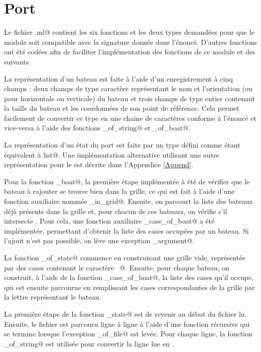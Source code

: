 \documentclass[a4paper,12pt]{article}
\begin{document}
\section{Port}

Le fichier \verb@port.ml@ contient les six fonctions et les deux types demandées pour que le module \verb@Port@ soit compatible avec la signature donnée dans l'énoncé. D'autres fonctions ont été codées afin de faciliter l'implémentation des fonctions de ce module et des suivants.

La représentation d'un bateau est faite à l'aide d'un enregistrement à cinq champs : deux champs de type caractère représentant le nom et l'orientation (\verb@H@ ou \verb@V@ pour horizontale ou verticale) du bateau et trois champs de type entier contenant la taille du bateau et les coordonnées de son point de référence. Cela permet facilement de convertir ce type en une chaine de caractères conforme à l'énoncé et vice-versa à l'aide des fonctions \verb@boat_of_string@ et \verb@string_of_boat@.

La représentation d'un état du port est faite par un type \verb@state@ défini comme étant équivalent à \verb@boat list@. Une implémentation alternative utilisant une autre représentation pour le \verb@state@ est décrite dans l'Appendice \ref{Append}.

Pour la fonction \verb@add_boat@, la première étape implémentée à été de vérifier que le bateau \verb@b@ à rajouter se trouve bien dans la grille, ce qui est fait à l'aide d'une fonction auxiliaire nommée \verb@boat_in_grid@. Ensuite, on parcourt la liste des bateaux déjà présents dans la grille et, pour chacun de ces bateaux, on vérifie s'il intersecte \verb@b@. Pour cela, une fonction auxiliaire \verb@list_case_of_boat@ a été implémentée, permettant d'obtenir la liste des cases occupées par un bateau. Si l'ajout n'est pas possible, on lève une exception \verb@Invalid_argument@.

La fonction \verb@grid_of_state@ commence en construisant une grille vide, représentée par des cases contenant le caractère \verb@~@. Ensuite, pour chaque bateau, on construit, à l'aide de la fonction \verb@list_case_of_boat@, la liste des cases qu'il occupe, qui est ensuite parcourue en remplissant les cases correspondantes de la grille par la lettre représentant le bateau.

La première étape de la fonction \verb@input_state@ est de revenir au début du fichier lu. Ensuite, le fichier est parcouru ligne à ligne à l'aide d'une fonction récursive qui se termine lorsque l'exception \verb@End_of_file@ est levée. Pour chaque ligne, la fonction \verb@boat_of_string@ est utilisée pour convertir la ligne lue en \verb@boat@.
\end{document}
